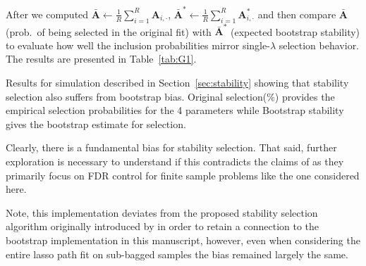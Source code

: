 After we computed $\bar{\mathbf A}\gets\tfrac1R\sum_{i=1}^{R}\mathbf A_{i,\cdot}$,  \; $\bar{\mathbf A}^{\!*}\gets\tfrac1R\sum_{i=1}^{R}\mathbf A^{\!*}_{i,\cdot}$ and then compare $\bar{\mathbf A}$ (prob.\ of being selected in the original fit) with $\bar{\mathbf A}^{\!*}$ (expected bootstrap stability) to evaluate how well the inclusion probabilities mirror single-$\lambda$ selection behavior. The results are presented in Table~\ref{tab:G1}.

\begin{table}[hbtp]
  \centering
  
  \caption{\label{tab:G1} Results for simulation described in Section~\ref{sec:stability} showing that stability selection also suffers from bootstrap bias. Original selection(\%) provides the empirical selection probabilities for the 4 parameters while Bootstrap stability gives the bootstrap estimate for selection.}
\end{table}

Clearly, there is a fundamental bias for stability selection. That said, further exploration is necessary to understand if this contradicts the claims of \cite{Meinshausen2010} as they primarily focus on FDR control for finite sample problems like the one considered here.

Note, this implementation deviates from the proposed stability selection algorithm originally introduced by \cite{Meinshausen2010} in order to retain a connection to the bootstrap implementation in this manuscript, however, even when considering the entire lasso path fit on sub-bagged samples the bias remained largely the same.
